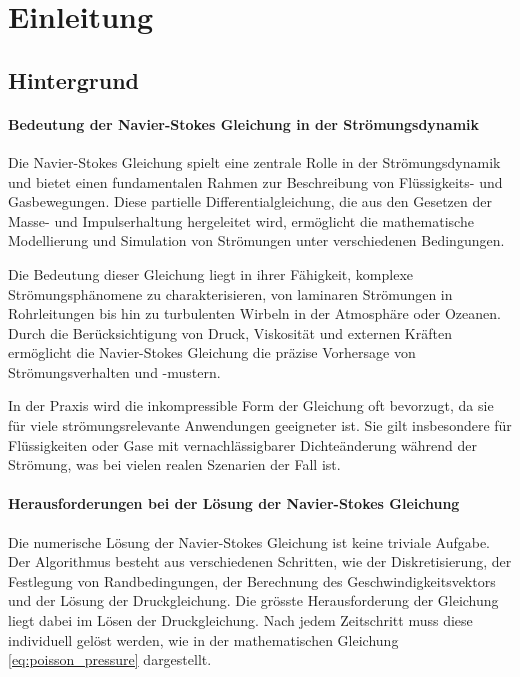 \section{Einleitung}
\subsection{Hintergrund}
\paragraph{Bedeutung der Navier-Stokes Gleichung in der Strömungsdynamik}
Die Navier-Stokes Gleichung spielt eine zentrale Rolle in der Strömungsdynamik und bietet einen fundamentalen Rahmen zur Beschreibung von Flüssigkeits- und Gasbewegungen. Diese partielle Differentialgleichung, die aus den Gesetzen der Masse- und Impulserhaltung hergeleitet wird, ermöglicht die mathematische Modellierung und Simulation von Strömungen unter verschiedenen Bedingungen. \parencite{simon_schneiderbauer_da8e2d1d}

Die Bedeutung dieser Gleichung liegt in ihrer Fähigkeit, komplexe Strömungsphänomene zu charakterisieren, von laminaren Strömungen in Rohrleitungen bis hin zu turbulenten Wirbeln in der Atmosphäre oder Ozeanen. Durch die Berücksichtigung von Druck, Viskosität und externen Kräften ermöglicht die Navier-Stokes Gleichung die präzise Vorhersage von Strömungsverhalten und -mustern. \parencite{p_g_drazin__n_riley_482fe063}

In der Praxis wird die inkompressible Form der Gleichung oft bevorzugt, da sie für viele strömungsrelevante Anwendungen geeigneter ist. Sie gilt insbesondere für Flüssigkeiten oder Gase mit vernachlässigbarer Dichteänderung während der Strömung, was bei vielen realen Szenarien der Fall ist. \parencite{p_g_drazin__n_riley_482fe063}

\paragraph{Herausforderungen bei der Lösung der Navier-Stokes Gleichung}
Die numerische Lösung der Navier-Stokes Gleichung ist keine triviale Aufgabe. Der Algorithmus besteht aus verschiedenen Schritten, wie der Diskretisierung, der Festlegung von Randbedingungen, der Berechnung des Geschwindigkeitsvektors und der Lösung der Druckgleichung. Die grösste Herausforderung der Gleichung liegt dabei im Lösen der Druckgleichung. Nach jedem Zeitschritt muss diese individuell gelöst werden, wie in der mathematischen Gleichung \ref{eq:poisson_pressure} dargestellt. \parencite{stefan_turek_3ee2e7b8}

